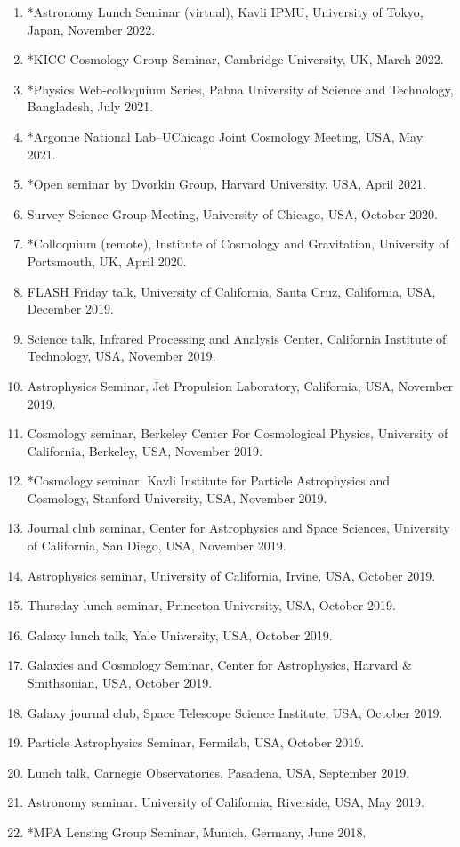 \documentclass[margin, line]{res}
\begin{document}
\begin{resume}
\begin{enumerate}
	\item {*}Astronomy Lunch Seminar (virtual), Kavli IPMU, University of Tokyo, Japan, November 2022.
	\item {*}KICC Cosmology Group Seminar, Cambridge University, UK, March 2022.
	\item {*}Physics Web-colloquium Series, Pabna University of Science and Technology, Bangladesh, July 2021.
	\item {*}Argonne National Lab--UChicago Joint Cosmology Meeting, USA, May 2021.
	\item {*}Open seminar by Dvorkin Group, Harvard University, USA, April 2021.
	\item Survey Science Group Meeting, University of Chicago, USA, October 2020.
	\item {*}Colloquium (remote), Institute of Cosmology and Gravitation, University of Portsmouth, UK, April 2020.
	\item FLASH Friday talk, University of California, Santa Cruz, California, USA, December 2019.
	\item Science talk, Infrared Processing and Analysis Center, California Institute of Technology, USA, November 2019.
	\item Astrophysics Seminar, Jet Propulsion Laboratory, California, USA, November 2019.
	\item Cosmology seminar, Berkeley Center For Cosmological Physics, University of California, Berkeley, USA, November 2019. 
	\item *Cosmology seminar, Kavli Institute for Particle Astrophysics and Cosmology, Stanford University, USA, November 2019.
	\item Journal club seminar, Center for Astrophysics and Space Sciences, University of California, San Diego, USA, November 2019.
	\item Astrophysics seminar, University of California, Irvine, USA, October 2019.
	\item Thursday lunch seminar, Princeton University, USA, October 2019.
	\item Galaxy lunch talk, Yale University, USA, October 2019.
	\item Galaxies and Cosmology Seminar, Center for Astrophysics, Harvard \& Smithsonian, USA, October 2019.
	\item Galaxy journal club, Space Telescope Science Institute, USA, October 2019.
	\item Particle Astrophysics Seminar, Fermilab, USA, October 2019.
	\item Lunch talk, Carnegie Observatories, Pasadena, USA, September 2019.
	\item Astronomy seminar. University of California, Riverside, USA, May 2019. 
	\item {*}MPA Lensing Group Seminar, Munich, Germany, June 2018.
\end{enumerate}



\end{resume}
\end{document}
